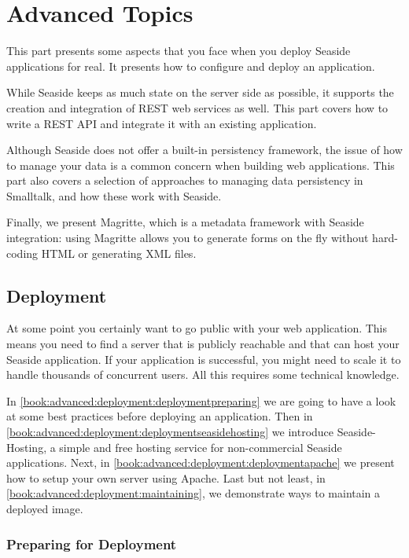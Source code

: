 \documentclass[a4paper,10pt,twoside]{book}
\begin{document}
\part{Advanced Topics}
\label{book:advanced}

This part presents some aspects that you face when you deploy Seaside applications for real. It presents how to configure and deploy an application.

While Seaside keeps as much state on the server side as possible, it supports the creation and integration of REST web services as well. This part covers how to write a REST API and integrate it with an existing application.

Although Seaside does not offer a built-in persistency framework, the issue of how to manage your data is a common concern when building web applications. This part also covers a selection of approaches to managing data persistency in Smalltalk, and how these work with Seaside. 

Finally, we present Magritte, which is a metadata framework with Seaside integration: using Magritte allows you to generate forms on the fly without hard-coding HTML or generating XML files.

\chapter{Deployment}
\label{book:advanced:deployment}

At some point you certainly want to go public with your web application. This means you need to find a server that is publicly reachable and that can host your Seaside application. If your application is successful, you might need to scale it to handle thousands of concurrent users. All this requires some technical knowledge. 

In \autoref{book:advanced:deployment:deploymentpreparing} we are going to have a look at some best practices before deploying an application. Then in \autoref{book:advanced:deployment:deploymentseasidehosting} we introduce Seaside-Hosting, a simple and free hosting service for non-commercial Seaside applications. Next, in \autoref{book:advanced:deployment:deploymentapache} we present how to setup your own server using Apache. Last but not least, in \autoref{book:advanced:deployment:maintaining}, we demonstrate ways to maintain a deployed image.

\section{Preparing for Deployment}
\label{book:advanced:deployment:deploymentpreparing}
\end{document}
